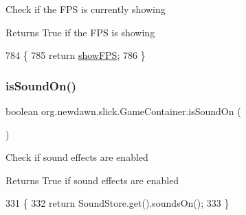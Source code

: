 Check if the F\+PS is currently showing

\begin{DoxyReturn}{Returns}
True if the F\+PS is showing 
\end{DoxyReturn}

\begin{DoxyCode}
784                                   \{
785         \textcolor{keywordflow}{return} \mbox{\hyperlink{classorg_1_1newdawn_1_1slick_1_1_game_container_a21f562c31b09838dbfb2f21048f093c6}{showFPS}};
786     \}
\end{DoxyCode}
\mbox{\label{classorg_1_1newdawn_1_1slick_1_1_game_container_a186f9af4994380c155c58a6cfea6e54f}} 
\subsubsection{\texorpdfstring{is\+Sound\+On()}{isSoundOn()}}
{\footnotesize\ttfamily boolean org.\+newdawn.\+slick.\+Game\+Container.\+is\+Sound\+On (\begin{DoxyParamCaption}{ }\end{DoxyParamCaption})\hspace{0.3cm}{\ttfamily [inline]}}

Check if sound effects are enabled

\begin{DoxyReturn}{Returns}
True if sound effects are enabled 
\end{DoxyReturn}

\begin{DoxyCode}
331                                \{
332         \textcolor{keywordflow}{return} SoundStore.get().soundsOn();
333     \}
\end{DoxyCode}
\mbox{\label{classorg_1_1newdawn_1_1slick_1_1_game_container_af38f108ac8b1ea17f4e75828b9777007}} 
